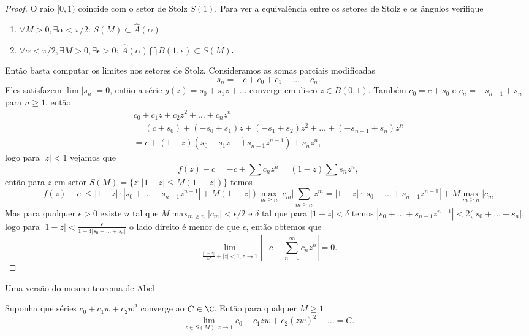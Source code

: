 \begin{proof}
O raio $[0,1)$ coincide com o setor de Stolz $S(1)$.
Para ver a equivalência entre os setores de Stolz e os ângulos verifique
\begin{problema}
\begin{enumerate}
\item $\forall M>0, \exists \alpha<\pi/2: \, S(M) \subset \widehat{A}(\alpha)$
\item $\forall \alpha<\pi/2, \exists M>0,\exists \epsilon>0: \, \widehat{A}(\alpha) \bigcap B(1,\epsilon) \subset S(M)$.
\end{enumerate}
\end{problema}

Então basta computar os limites nos setores de Stolz.
Consideramos as somas parciais modificadas
\[ s_n = -c + c_0 + c_1  + \dots + c_n .\]
Eles satisfazem $\lim |s_n| = 0$, então a série $g(z) = s_0 + s_1 z + \dots$
converge em disco $z\in B(0,1)$.
Também $c_0 = c + s_0$ e $c_n = -s_{n-1} + s_n$ para $n\geq 1$, então
\begin{multline*}
            c_0  +         c_1 z +       c_2 z^2 + \dots +           c_n z^n  
\\ = (c       + s_0) + (-s_0 + s_1)z + (-s_1+s_2)z^2 + \dots + (-s_{n-1}+s_n)z^n
\\ =  c + (1-z)(s_0  +         s_1 z + \dot                 + s_{n-1} z^{n-1}) + s_n z^n,
\end{multline*}
logo para $|z|<1$ vejamos que
\[ f(z) -c = -c + \sum c_n z^n = (1-z) \sum s_n z^n, \]
então para $z$ em setor $S(M) = \{z : |1-z|\leq M(1-|z|)\}$ temos
\[ |f(z) - c| \leq |1-z|\cdot|s_0+\dots+s_{n-1}z^{n-1}| + M(1-|z|)\max_{m\geq n} |c_m| \sum_{m\geq n} z^m
= |1-z|\cdot|s_0+\dots+s_{n-1}z^{n-1}| + M \max_{m\geq n} |c_m| \]
Mas para qualquer $\epsilon>0$ existe $n$ tal que $M \max_{m\geq n} |c_m| < \epsilon/2$
e $\delta$ tal que para $|1-z|<\delta$ temos $|s_0+\dots+s_{n-1}z^{n-1}|<2(|s_0+\dots+s_n|$,
logo para $|1-z|<\frac{\epsilon}{1+4|s_0+\dots+s_n|}$ o lado direito é menor de que $\epsilon$,
então obtemos que 
\[ \lim_{\frac{|1-z|}M + |z|<1,z\to 1} |-c+\sum_{n=0}^\infty c_n z^n| = 0. \]
\end{proof}

Uma versão do mesmo teorema de Abel
\begin{teorema}
Suponha que séries $c_0 + c_1 w + c_2 w^2$ converge ao $C\in\C$.
Então para qualquer $M\geq 1$
\[ \lim_{z\in S(M),z\to 1} c_0 + c_1 zw + c_2 (zw)^2 + \dots = C. \]
\end{teorema}

